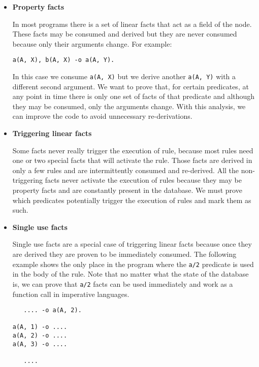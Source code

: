 \begin{itemize}
   
   \item \textbf{Property facts}
   
   In most programs there is a set of linear facts that act as a field of the node. These facts may
   be consumed and derived but they are never consumed because only their arguments change.
   For example:

\begin{Verbatim}
a(A, X), b(A, X) -o a(A, Y).
\end{Verbatim}

   In this case we consume \texttt{a(A, X)} but we derive another \texttt{a(A, Y)} with a different
   second argument. We want to prove that, for certain predicates, at any point in time there is only one
   set of facts of that predicate and although they may be consumed, only the arguments change.
   With this analysis, we can improve the code to avoid unnecessary re-derivations.
   
   \item \textbf{Triggering linear facts}
   
   Some facts never really trigger the execution of rule, because most rules need one or two special facts that
   will activate the rule. Those facts are derived in only a few rules and are intermittently consumed and
   re-derived. All the non-triggering facts never activate the execution of rules because they may be
   property facts and are constantly present in the database.
   We must prove which predicates potentially trigger the execution of rules and mark them as such.
   
   \item \textbf{Single use facts}
   
   Single use facts are a special case of triggering linear facts because once they are derived they are
   proven to be immediately consumed. The following example shows the only place in the program where
   the \texttt{a/2} predicate is used in the body of the rule. Note that no matter what the state of
   the database is, we can prove that \texttt{a/2} facts can be used immediately and work as a function
   call in imperative languages.
   
   \begin{Verbatim}
   .... -o a(A, 2).

a(A, 1) -o ....
a(A, 2) -o ....
a(A, 3) -o ....

   ....
   \end{Verbatim}
    
\end{itemize}

